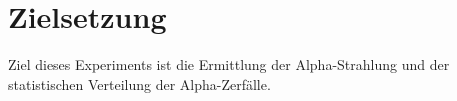 \section{Zielsetzung}
\label{sec:Zielsetzung}

Ziel dieses Experiments ist die Ermittlung der Alpha-Strahlung und der statistischen 
Verteilung der Alpha-Zerfälle.
